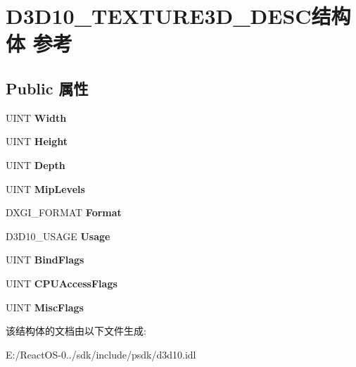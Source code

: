 \hypertarget{struct_d3_d10___t_e_x_t_u_r_e3_d___d_e_s_c}{}\section{D3\+D10\+\_\+\+T\+E\+X\+T\+U\+R\+E3\+D\+\_\+\+D\+E\+S\+C结构体 参考}
\label{struct_d3_d10___t_e_x_t_u_r_e3_d___d_e_s_c}
\subsection*{Public 属性}
\begin{DoxyCompactItemize}
\item 
\mbox{\label{struct_d3_d10___t_e_x_t_u_r_e3_d___d_e_s_c_a84895ad0e0da51fb9095a2a3ecb2f269}} 
U\+I\+NT {\bfseries Width}
\item 
\mbox{\label{struct_d3_d10___t_e_x_t_u_r_e3_d___d_e_s_c_aa777f97774cc2409e419726f4b26aef7}} 
U\+I\+NT {\bfseries Height}
\item 
\mbox{\label{struct_d3_d10___t_e_x_t_u_r_e3_d___d_e_s_c_ae925c25342b3536f60fc2737c6b94bb0}} 
U\+I\+NT {\bfseries Depth}
\item 
\mbox{\label{struct_d3_d10___t_e_x_t_u_r_e3_d___d_e_s_c_a7df39b1d5ee0ed4fe3cdc60ac0ebb89d}} 
U\+I\+NT {\bfseries Mip\+Levels}
\item 
\mbox{\label{struct_d3_d10___t_e_x_t_u_r_e3_d___d_e_s_c_a9ab8006e79de2cca74404009809cf76f}} 
D\+X\+G\+I\+\_\+\+F\+O\+R\+M\+AT {\bfseries Format}
\item 
\mbox{\label{struct_d3_d10___t_e_x_t_u_r_e3_d___d_e_s_c_a7faf3424a6414cd4b156bbd0413f52de}} 
D3\+D10\+\_\+\+U\+S\+A\+GE {\bfseries Usage}
\item 
\mbox{\label{struct_d3_d10___t_e_x_t_u_r_e3_d___d_e_s_c_a35da9a2b8cec19d651dc30809b4ad970}} 
U\+I\+NT {\bfseries Bind\+Flags}
\item 
\mbox{\label{struct_d3_d10___t_e_x_t_u_r_e3_d___d_e_s_c_a4ab6c0d7153ad425794de33887456e28}} 
U\+I\+NT {\bfseries C\+P\+U\+Access\+Flags}
\item 
\mbox{\label{struct_d3_d10___t_e_x_t_u_r_e3_d___d_e_s_c_ab5d1c33a587722297e8393cb814a35ba}} 
U\+I\+NT {\bfseries Misc\+Flags}
\end{DoxyCompactItemize}


该结构体的文档由以下文件生成\+:\begin{DoxyCompactItemize}
\item 
E\+:/\+React\+O\+S-\/0../sdk/include/psdk/d3d10.\+idl\end{DoxyCompactItemize}
